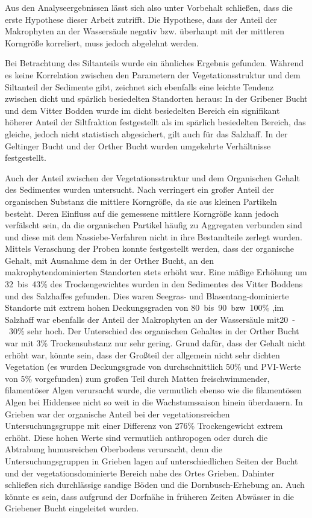 Aus den Analyseergebnissen lässt sich also unter Vorbehalt schließen, dass die erste Hypothese dieser Arbeit zutrifft. Die Hypothese, dass der Anteil der Makrophyten an der Wassersäule negativ bzw. überhaupt mit der mittleren Korngröße korreliert, muss jedoch abgelehnt werden.

Bei Betrachtung des Siltanteils wurde ein ähnliches Ergebnis gefunden. Während es keine Korrelation zwischen den Parametern der Vegetationsstruktur und dem Siltanteil der Sedimente gibt, zeichnet sich ebenfalls eine leichte Tendenz zwischen dicht und spärlich besiedelten Standorten heraus: In der Gribener Bucht und dem Vitter Bodden wurde im dicht besiedelten Bereich ein signifikant höherer Anteil der Siltfraktion festgestellt als im spärlich besiedelten Bereich, das gleiche, jedoch nicht statistisch abgesichert, gilt auch für das Salzhaff. In der Geltinger Bucht und der Orther Bucht wurden umgekehrte Verhältnisse festgestellt. 

Auch der Anteil zwischen der Vegetationsstruktur und dem Organischen Gehalt des Sedimentes wurden untersucht. Nach \cite{steinhardt_2001} verringert ein großer Anteil der organischen Substanz die mittlere Korngröße, da sie aus kleinen Partikeln besteht. Deren Einfluss auf die gemessene mittlere Korngröße kann jedoch verfälscht sein, da die organischen Partikel häufig zu Aggregaten verbunden sind und diese mit dem Nassiebe-Verfahren nicht in ihre Bestandteile zerlegt wurden. Mittels Veraschung der Proben konnte festgestellt werden, dass der organische Gehalt, mit Ausnahme dem in der Orther Bucht, an den makrophytendominierten Standorten stets erhöht war. Eine mäßige Erhöhung um \unit{32 bis 43}{\%} des Trockengewichtes wurden in den Sedimentes des Vitter Boddens und des Salzhaffes gefunden. Dies waren Seegras- und Blasentang-dominierte Standorte mit extrem hohen Deckungsgraden von  \unit{80 bis 90 bzw. 100}{\%} ,im Salzhaff war ebenfalls der Anteil der Makrophyten an der Wassersäule mit\unit{20-30}{\%} sehr hoch. Der Unterschied des organischen Gehaltes in der Orther Bucht war mit \unit{3}{\%}  Trockensubstanz nur sehr gering. Grund dafür, dass der Gehalt nicht erhöht war, könnte sein, dass der Großteil der allgemein nicht sehr dichten Vegetation (es wurden Deckungsgrade von durchschnittlich \unit{50}{\%} und PVI-Werte von \unit{5}{\%} vorgefunden) zum großen Teil durch Matten freischwimmender, filamentöser Algen verursacht wurde, die vermutlich ebenso wie die filamentösen Algen bei Hiddensee nicht so weit in die Wachstumssaison hinein überdauern. In Grieben war der organische Anteil bei der vegetationsreichen Untersuchungsgruppe mit einer Differenz von \unit{276}{\%} Trockengewicht extrem erhöht. Diese hohen Werte sind vermutlich anthropogen oder durch die Abtrabung humusreichen Oberbodens verursacht, denn die Untersuchungsgruppen in Grieben lagen auf unterschiedlichen Seiten der Bucht und der vegetationsdominierte Bereich nahe des Ortes Grieben. Dahinter schließen sich durchlässige sandige Böden und die Dornbusch-Erhebung an. Auch könnte es sein, dass aufgrund der Dorfnähe in früheren Zeiten Abwässer in die Griebener Bucht eingeleitet wurden. 


